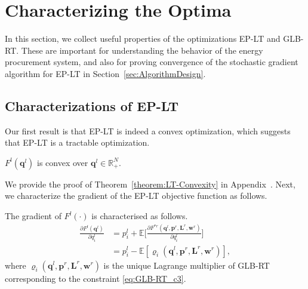 \section{Characterizing the Optima}
\label{sec:characterizingOptima}

In this section, we collect useful properties of the optimizations
EP-LT and GLB-RT. These are important for understanding the behavior
of the energy procurement system, and also for proving convergence of
the stochastic gradient algorithm for EP-LT in
Section~\ref{sec:AlgorithmDesign}.


\subsection{Characterizations of EP-LT}

\label{sec:char_ep-lt}

Our first result is that EP-LT is indeed a convex optimization, which
suggests that EP-LT is a tractable optimization.


\begin{theorem}
	\label{theorem:LT-Convexity}
	$F^l(\textbf{q}^l)$ is convex over $\textbf{q}^l \in \mathbb{R}^N_+.$
\end{theorem}
We provide the proof of Theorem~\ref{theorem:LT-Convexity} in Appendix~. Next, we characterize the gradient of the EP-LT objective function as
follows.

\begin{theorem}
	\label{theorem:lt_gradient}
	The gradient of $F^l(\cdot)$ is characterised as follows.
	\begin{align*}
	\frac{\partial F^l(\textbf{q}^l)} {\partial q^l_i} &= p^l_i +
	\mathbb{E} \bigg[ \frac{\partial F^{*r}(\textbf{q}^l,\textbf{p}^r,\textbf{L}^r,\textbf{w}^r)}  {\partial q^l_i} \bigg] \\
	&=p^l_i -\mathbb{E}
	\left[\varrho_i(\textbf{q}^l,\textbf{p}^r,\textbf{L}^r,\textbf{w}^r)
	\right],
	\end{align*}    
	where $\varrho_i(\textbf{q}^l,\textbf{p}^r,\textbf{L}^r,\textbf{w}^r)$
	is the unique Lagrange multiplier of GLB-RT corresponding to the
	constraint \eqref{eq:GLB-RT_c3}.
\end{theorem}


